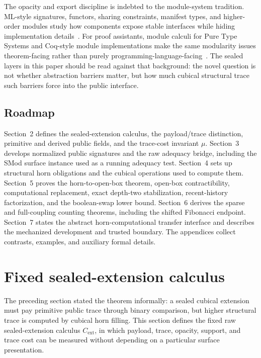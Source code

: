 \documentclass{lmcs}
\begin{document}
The opacity and export discipline is indebted to the module-system tradition.
ML-style signatures, functors, sharing constraints, manifest types, and
higher-order modules study how components expose stable interfaces while hiding
implementation details~\cite{macqueen-modules,harper-lillibridge,leroy-manifest,dreyer-higher-modules}.
For proof assistants, module calculi for Pure Type Systems and Coq-style module
implementations make the same modularity issues theorem-facing rather than
purely programming-language-facing~\cite{courant-pts-modules,chrzaszcz-coq-modules,filliatre-letouzey}.
The sealed layers in this paper should be read against that background: the
novel question is not whether abstraction barriers matter, but how much cubical
structural trace such barriers force into the public interface.

\subsection{Roadmap}

Section~2 defines the sealed-extension calculus, the payload/trace distinction,
primitive and derived public fields, and the trace-cost invariant \(\mu\).
Section~3 develops normalized public signatures and the raw adequacy bridge,
including the SMod surface instance used as a running adequacy test.  Section~4
sets up structural horn obligations and the cubical operations used to compute
them.  Section~5 proves the horn-to-open-box theorem, open-box contractibility,
computational replacement, exact depth-two stabilization, recent-history
factorization, and the boolean-swap lower bound.  Section~6 derives the sparse
and full-coupling counting theorems, including the shifted Fibonacci endpoint.
Section~7 states the abstract horn-computational transfer interface and describes
the mechanized development and trusted boundary.  The appendices collect
contrasts, examples, and auxiliary formal details.

\newpage
\setcounter{tocdepth}{2}
\tableofcontents
\newpage

\section{Fixed sealed-extension calculus}

The preceding section stated the theorem informally: a sealed cubical extension must pay
primitive public trace through binary comparison, but higher structural trace is computed by
cubical horn filling.  This section defines the fixed raw sealed-extension calculus
\(C_{\mathrm{ext}}\), in which payload, trace, opacity, support, and trace cost can be measured
without depending on a particular surface presentation.
\end{document}
